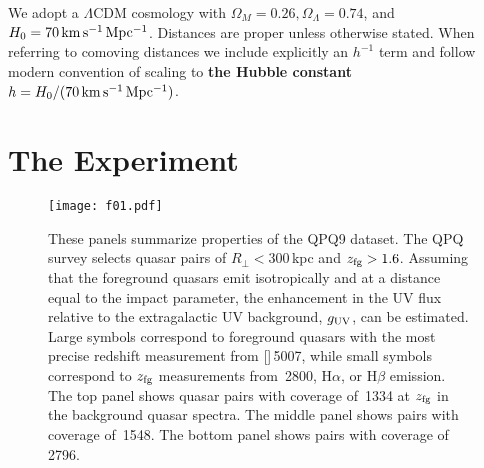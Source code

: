 \documentclass[iop]{emulateapj}
\begin{document}

We adopt a $\Lambda$CDM cosmology with $\Omega_M=0.26, \Omega_\Lambda=0.74$, and 
$H_0=70\,{\rm km\,s^{-1}\,Mpc^{-1}}$. Distances are proper unless otherwise stated. When referring 
to comoving distances we include explicitly an $h^{-1}$ term and follow modern convention of 
scaling to {\bf the Hubble constant $h = H_0/(70\,{\rm km\,s^{-1}\,Mpc^{-1}})$}.

\section{The Experiment}
\label{sec:experiment}

%


\begin{figure}
\texttt{[image: f01.pdf]}
\caption{These panels summarize properties of the QPQ9 dataset. The QPQ survey selects 
quasar pairs of $R_\perp < 300$\,kpc and $z_{\rm fg}>1.6$. Assuming that the foreground quasars 
emit isotropically and at a distance equal to the impact parameter, the enhancement in the UV 
flux relative to the extragalactic UV background, $g_{\rm UV}$, can be estimated. Large 
symbols correspond to foreground quasars with the most precise redshift measurement from 
[]\,5007, while small symbols correspond to $z_{\rm fg}$ 
measurements from \,2800, H$\alpha$, or H$\beta$ emission. The top panel shows 
quasar pairs with coverage of \,1334 at $z_{\rm fg}$ in the background quasar spectra. 
The middle panel shows pairs with coverage of \,1548. The bottom panel shows 
pairs with coverage of \,2796. 
}
\label{fig:experiment}
\end{figure}
\end{document}
